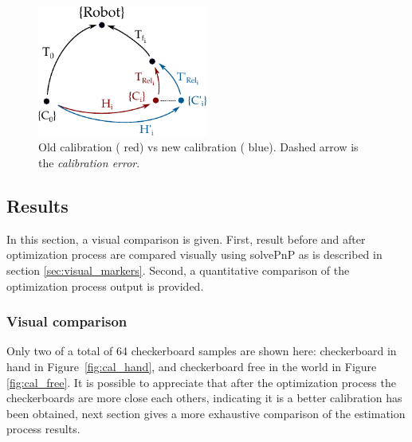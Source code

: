 \begin{figure}[!htbp]
 \centering
 \includegraphics[width=0.5\textwidth]{images/update02.pdf}
 \caption{Old calibration ({\color{red} red}) vs new calibration ({\color{blue} blue}). Dashed arrow is the \textit{calibration error}.}
 \label{fig:update02}
\end{figure}


\subsection{Results}
\label{sec:results}

In this section, a visual comparison is given. First, result before and after optimization process are compared visually using solvePnP as is described in section \ref{sec:visual_markers}. Second, a quantitative comparison of the optimization process output is provided.

\subsubsection{Visual comparison}

Only two of a total of 64 checkerboard samples are shown here: checkerboard in hand in Figure~\ref{fig:cal_hand}, and checkerboard free in the world in Figure \ref{fig:cal_free}. It is possible to appreciate that after the optimization process the checkerboards are more close each others, indicating it is a better calibration has been obtained, next section gives a more exhaustive comparison of the estimation process results.
%

